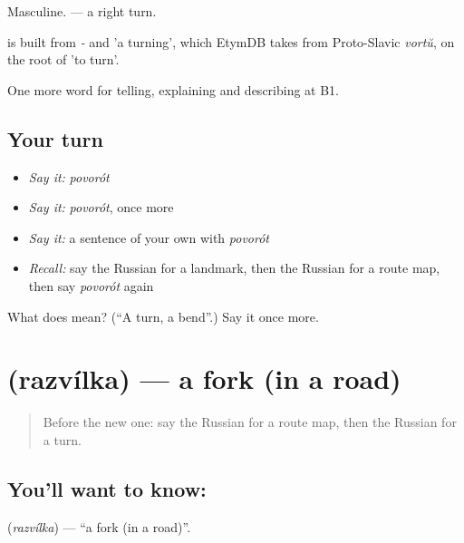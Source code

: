 Masculine. \emph{ } — a right turn.

\begin{cousinweb}
\emph{} is built from \emph{-} and \emph{} 'a turning', which EtymDB takes from Proto-Slavic \emph{vortŭ}, on the root of \emph{} 'to turn'.
\end{cousinweb}

\begin{grammarlens}[title={What you've built}]
One more word for telling, explaining and describing at B1.
\end{grammarlens}

\subsection*{Your turn}
\begin{itemize}
\raggedright
  \item \emph{Say it:} \emph{povorót}
  \item \emph{Say it:} \emph{povorót}, once more
  \item \emph{Say it:} a sentence of your own with \emph{povorót}
  \item \emph{Recall:} say the Russian for a landmark, then the Russian for a route map, then say \emph{povorót} again
\end{itemize}

\begin{tcolorbox}[breakable,colback=teal!4,colframe=teal!35!black,title={Before you move on}]
What does  mean? (\textquotedblleft{}A turn, a bend\textquotedblright{}.) Say it once more.
\end{tcolorbox}
\section[\texorpdfstring{\ru{развилка} (razvílka)}{развилка (razvílka)}]{ (razvílka) — a fork (in a road)}

\label{lesson:RU-C439-razvilka}



\begin{quote}
Before the new one: say the Russian for a route map, then the Russian for a turn.
\end{quote}

\subsection*{You'll want to know: }
\textbf{} (\emph{razvílka}) — \textquotedblleft{}a fork (in a road)\textquotedblright{}.


